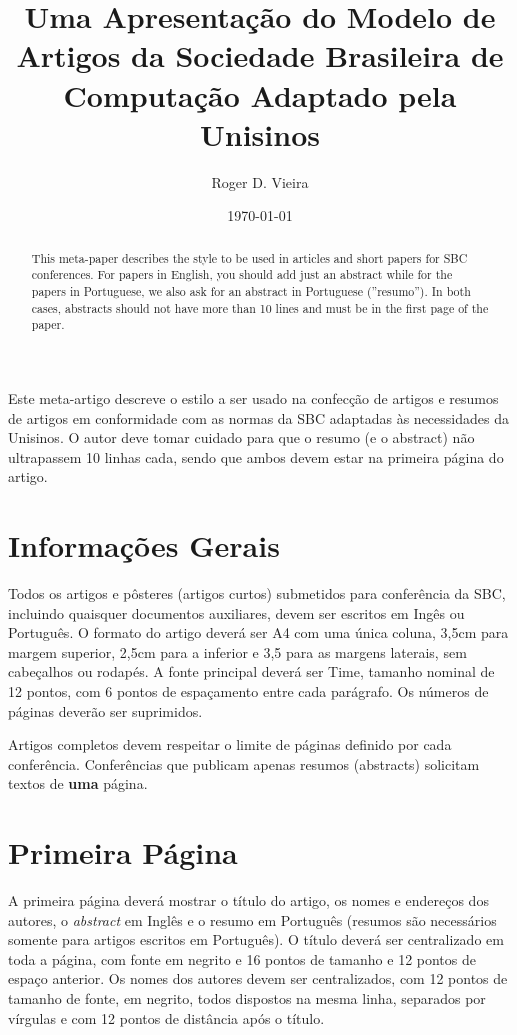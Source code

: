 \documentclass[12pt]{article}
\date{\today}
\title{
    Uma Apresentação do Modelo de Artigos da Sociedade Brasileira de Computação Adaptado pela Unisinos
}
\author{Roger D. Vieira\inst{1}}
\begin{document}
 

\imprimircapa
\imprimirfolhaderosto

\maketitle

\begin{abstract}
  This meta-paper describes the style to be used in articles and short papers
  for SBC conferences. For papers in English, you should add just an abstract
  while for the papers in Portuguese, we also ask for an abstract in
  Portuguese (''resumo''). In both cases, abstracts should not have more than
  10 lines and must be in the first page of the paper.
\end{abstract}
     
\begin{resumo} 
  Este meta-artigo descreve o estilo a ser usado na confecção de artigos e   resumos de artigos em conformidade com as normas da SBC adaptadas às necessidades da Unisinos. O autor deve tomar cuidado para que o resumo (e o abstract) não ultrapassem 10 linhas cada, sendo que ambos devem estar na primeira
  página do artigo.
\end{resumo}


\section{Informações Gerais}


Todos os artigos e pôsteres (artigos curtos) submetidos para conferência da SBC, incluindo quaisquer documentos auxiliares, devem ser escritos em Ingês ou Português. O formato do artigo deverá ser A4 com uma única coluna, 3,5cm para margem superior,  2,5cm para a inferior e 3,5 para as margens laterais, sem cabeçalhos ou rodapés. A fonte principal deverá ser Time, tamanho nominal de 12 pontos, com 6 pontos de espaçamento entre cada parágrafo. Os números de páginas deverão ser suprimidos.

Artigos completos devem respeitar o limite de páginas definido por cada conferência. Conferências que publicam apenas resumos (abstracts) solicitam textos de \textbf{uma} página.

\section{Primeira Página} \label{sec:firstpage}

A primeira página deverá mostrar o título do artigo, os nomes e endereços dos autores, o \emph{abstract} em Inglês e o resumo em Português (resumos são necessários somente para artigos escritos em Português). O título deverá ser centralizado em toda a página, com fonte em negrito e 16 pontos de tamanho e 12 pontos de espaço anterior. Os nomes dos autores devem ser centralizados, com 12 pontos de tamanho de fonte, em negrito, todos dispostos na mesma linha, separados por vírgulas e com 12 pontos de distância após o título. 
\end{document}
